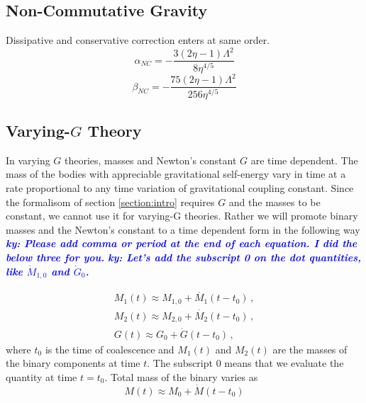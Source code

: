 \documentclass[11pt]{article}
\newcommand{\ky}[1]{\textcolor{blue}{\it{\textbf{ky: #1}}} }
\begin{document}
 \subsection{Non-Commutative Gravity}
 Dissipative and conservative correction enters at same order. \cite{Kobakhidze:2016cqh}
 \begin{equation}
 \alpha_{NC}=-\frac{3 (2 \eta -1) \Lambda ^2}{8 \eta ^{4/5}}
 \end{equation}
 \begin{equation}
 \beta_{NC}=-\frac{75 (2 \eta -1) \Lambda ^2}{256 \eta ^{4/5}}
 \end{equation}
 \newpage
 
 \subsection{Varying-$G$ Theory}

 \hspace*{15.5pt} In varying $G$ theories, masses and Newton's constant $G$ are time dependent. The mass of the bodies with appreciable gravitational self-energy vary in time at a rate proportional to any time variation of gravitational coupling constant\cite{PhysRevLett.65.953}. Since the formalisom of section \ref{section:intro} requires $G$ and the masses to be constant, we cannot use it for varying-G theories. Rather we will promote binary masses and the Newton's constant to a time dependent form in the following way \ky{Please add comma or period at the end of each equation. I did the below three for you.} \ky{Let's add the subscript 0 on the dot quantities, like $\dot M_{1,0}$ and $\dot G_0$.}
 
 \begin{eqnarray}\label{eq:3.7a2}
 M_1(t)\approx M_{1,0}+\dot{M_1}(t-t_0)\,, \\
 \label{eq:3.7a3}  M_2(t)\approx M_{2,0}+\dot{M_2}(t-t_0)\,, \\
   \label{eq:3.7a4}  G(t)\approx  G_0+\dot{G}(t-t_0)\,, 
 \end{eqnarray}
 where $t_0$ is the time of coalescence and $M_1(t)$ and $M_2(t)$ are the masses of the binary components at time $t$. %
 The subscript 0 means that we evaluate the quantity at time $t=t_0$. Total mass of the binary varies as
 \begin{equation}
 M(t)\approx M_0+\dot{M}(t-t_0)
 \end{equation}
 
\end{document}
